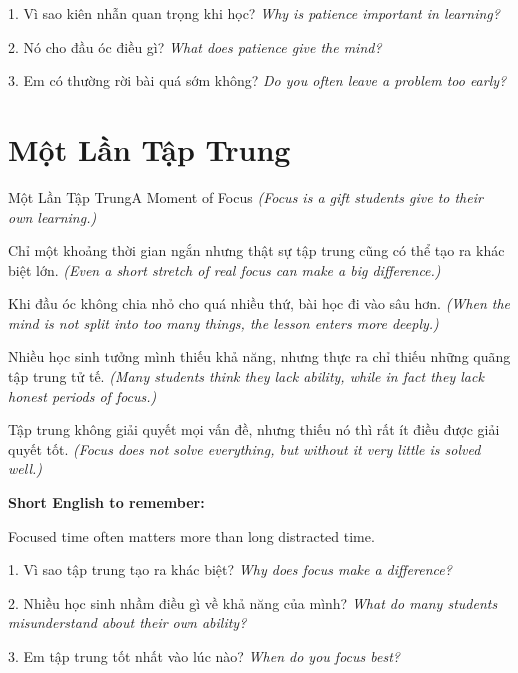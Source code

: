 \begin{tuhocnhanh}
1. Vì sao kiên nhẫn quan trọng khi học? \textit{Why is patience important in learning?}

2. Nó cho đầu óc điều gì? \textit{What does patience give the mind?}

3. Em có thường rời bài quá sớm không? \textit{Do you often leave a problem too early?}
\end{tuhocnhanh}
\ngancach

\section{Một Lần Tập Trung}
\begin{truyen}{Một Lần Tập Trung}{A Moment of Focus}
\textit{(Focus is a gift students give to their own learning.)}

Chỉ một khoảng thời gian ngắn nhưng thật sự tập trung cũng có thể tạo ra khác biệt lớn.
\textit{(Even a short stretch of real focus can make a big difference.)}

Khi đầu óc không chia nhỏ cho quá nhiều thứ, bài học đi vào sâu hơn.
\textit{(When the mind is not split into too many things, the lesson enters more deeply.)}

Nhiều học sinh tưởng mình thiếu khả năng, nhưng thực ra chỉ thiếu những quãng tập trung tử tế.
\textit{(Many students think they lack ability, while in fact they lack honest periods of focus.)}
\end{truyen}

\begin{baihoc}
Tập trung không giải quyết mọi vấn đề, nhưng thiếu nó thì rất ít điều được giải quyết tốt.
\textit{(Focus does not solve everything, but without it very little is solved well.)}
\end{baihoc}

\begin{ghinhoanh}
\textbf{Short English to remember:}

Focused time often matters more than long distracted time.

\end{ghinhoanh}

\begin{tuhocnhanh}
1. Vì sao tập trung tạo ra khác biệt? \textit{Why does focus make a difference?}

2. Nhiều học sinh nhầm điều gì về khả năng của mình? \textit{What do many students misunderstand about their own ability?}

3. Em tập trung tốt nhất vào lúc nào? \textit{When do you focus best?}
\end{tuhocnhanh}
\ngancach

